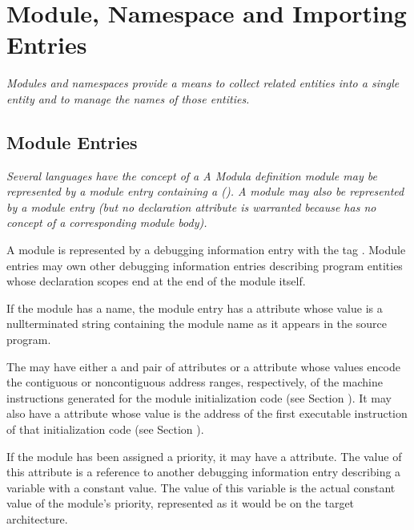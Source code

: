 \section{Module, Namespace and Importing Entries}
\textit{Modules and namespaces provide a means to collect related
entities into a single entity and to manage the names of
those entities.}

\subsection{Module Entries}
\label{chap:moduleentries}
\textit{Several languages have the concept of a 
A Modula definition module 
may be represented by a module
entry containing a 
(\DWATdeclaration). A
 module 
may also be represented by a module entry
(but no declaration attribute is warranted because 
has no concept of a corresponding module body).}

A module is represented by a debugging information entry
with the 
tag \DWTAGmoduleTARG.  
Module entries may own other
debugging information entries describing program entities
whose declaration scopes end at the end of the module itself.

If the module has a name, the module entry has a 
\DWATname{} attribute 
whose value is a null\dash terminated string containing
the module name as it appears in the source program.

The  may have either a 
\DWATlowpc{} and
\DWAThighpc{} 
pair 
of 
attributes or a 
\DWATranges{} attribute
whose values encode the contiguous or non\dash contiguous address
ranges, respectively, of the machine instructions generated for
the module initialization code 
(see Section ). 
\hypertarget{chap:DWATentrypcentryaddressofmoduleinitialization}{}
It may also
have a 
\DWATentrypc{} attribute whose value is the address of
the first executable instruction of that initialization code
(see Section ).

If 
\hypertarget{chap:DWATprioritymodulepriority}{}
the module has been assigned a priority, it may have 
a
\DWATpriority{} attribute. 
The value of this attribute is a
reference to another debugging information entry describing
a variable with a constant value. The value of this variable
is the actual constant value of the module\textquoteright s priority,
represented as it would be on the target architecture.

